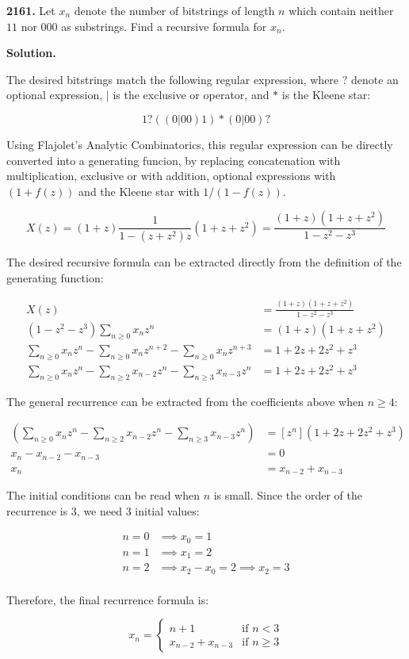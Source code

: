 \documentclass{letter}
\begin{document}
\newtheorem{lemma}{Lemma}

\begin{letter}{}

  \textbf{2161.} Let $x_n$ denote the number of bitstrings of length $n$ which contain neither $11$ nor $000$ as substrings. Find a recursive formula for $x_n$.

  \textbf{Solution.}

  The desired bitstrings match the following regular expression, where $?$ denote an optional expression, $|$ is the exclusive or operator, and $*$ is the Kleene star:

$$1?((0|00)1)*(0|00)?$$

  Using Flajolet's Analytic Combinatorics, this regular expression can be directly converted into a generating funcion, by replacing concatenation with multiplication, exclusive or with addition, optional expressions with $(1+f(z))$ and the Kleene star with $1/(1-f(z))$.

  $$X(z)=\left(1 + z\right)\frac{1}{1-\left(z+z^2\right)z}\left(1+z+z^2\right)
  =\frac{(1+z)(1+z+z^2)}{1-z^2-z^3}$$

The desired recursive formula can be extracted directly from the definition of the generating function:

  \begin{align*}
  X(z) &= \frac{(1+z)(1+z+z^2)}{1-z^2-z^3} \\
  \left(1-z^2-z^3\right)\sum_{n\ge 0}x_n z^n &= (1+z)(1+z+z^2) \\
  \sum_{n\ge 0}x_n z^n - \sum_{n\ge 0}x_n z^{n+2} - \sum_{n\ge 0}x_n z^{n+3} 
  &= 1+2z+2z^2+z^3\\
  \sum_{n\ge 0}x_n z^n - \sum_{n\ge 2}x_{n-2} z^n - \sum_{n\ge 3}x_{n-3} z^n 
  &= 1+2z+2z^2+z^3
  \end{align*}

The general recurrence can be extracted from the coefficients above when $n\ge 4$:

  \begin{align*}
  [z^n]\left(\sum_{n\ge 0}x_n z^n - \sum_{n\ge 2}x_{n-2} z^n - \sum_{n\ge 3}x_{n-3} z^n \right)
  &= [z^n]\left(1+2z+2z^2+z^3\right)\\
  x_n - x_{n-2} - x_{n-3}  &= 0\\
  x_n &= x_{n-2} + x_{n-3}
  \end{align*}

The initial conditions can be read when $n$ is small. Since the order of the recurrence is 3, we need 3 initial values:

\begin{align*}
n = 0 &\implies x_0 = 1 \\
n = 1 &\implies x_1 = 2 \\
n = 2 &\implies x_2 - x_0 = 2 \implies x_2 = 3\\
\end{align*}

Therefore, the final recurrence formula is:

$$x_n=\begin{cases}
  n+1 & \text{if $n < 3$} \\
  x_{n-2}+x_{n-3} & \text{if $n \ge 3$}
  \end{cases}$$


\end{letter}
\end{document}
